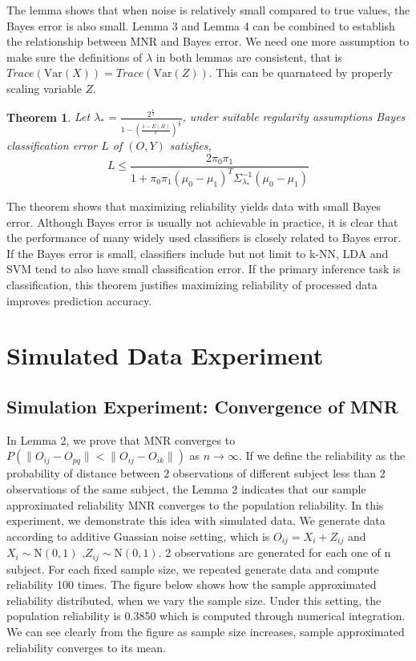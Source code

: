 \documentclass[11pt,journal,compsoc]{IEEEtran}
\newtheorem{theorem}{Theorem}
\begin{document}
The lemma shows that when noise is relatively small compared to true values, the Bayes error is also small. Lemma 3 and Lemma 4 can be combined to establish the relationship between MNR and Bayes error. We need one more assumption to make sure the definitions of $\lambda$ in both lemmas are consistent, that is $Trace(\text{Var}(X))=Trace(\text{Var}(Z))$. This can be quarnateed by properly scaling variable $Z$.
\begin{theorem}
Let $\lambda_{\ast}=\frac{2^{\frac{1}{4}}}{1-(\frac{1-E(R)}{c})^{\frac{1}{3}}}$, under suitable regularity assumptions Bayes classification error $L$ of $(O,Y)$ satisfies,
\[ L \leq \frac{2\pi_0\pi_1}{1+\pi_0\pi_1(\mu_0-\mu_1)^T\Sigma_{\lambda_\ast}^{-1}(\mu_0-\mu_1)}\]
\end{theorem} 
\noindent The theorem shows that maximizing reliability yields data with small Bayes error. Although Bayes error is usually not achievable in practice, it is clear that the performance of many widely used classifiers is closely related to Bayes error. If the Bayes error is small, classifiers include but not limit to k-NN, LDA and SVM tend to also have small classification error. If the primary inference task is classification, this theorem justifies maximizing reliability of processed data improves prediction accuracy.

\section{Simulated Data Experiment}


\subsection{Simulation Experiment: Convergence of MNR}
\noindent In Lemma 2, we prove that MNR converges to $P(\|O_{ij}-O_{pq}\| < \|O_{ij}-O_{ik}\|)$ as $n\rightarrow\infty$. If we define the reliability as the probability of distance between 2 observations of different subject less than 2 observations of the same subject, the Lemma 2 indicates that our sample approximated reliability MNR converges to the population reliability. In this experiment, we demonstrate this idea with simulated data. We generate data according to additive Guassian noise setting, which is $O_{ij}=X_i+Z_{ij}$ and $X_i \sim \text{N}(0,1) \text{ ,}Z_{ij} \sim \text{N}(0,1)$. 2 observations are generated for each one of n subject. For each fixed sample size, we repeated generate data and compute reliability 100 times. The figure below shows how the sample approximated reliability distributed, when we vary the sample size. Under this setting, the population reliability is 0.3850 which is computed through numerical integration. We can see clearly from the figure as sample size increases, sample approximated reliability converges to its mean.
\end{document}
